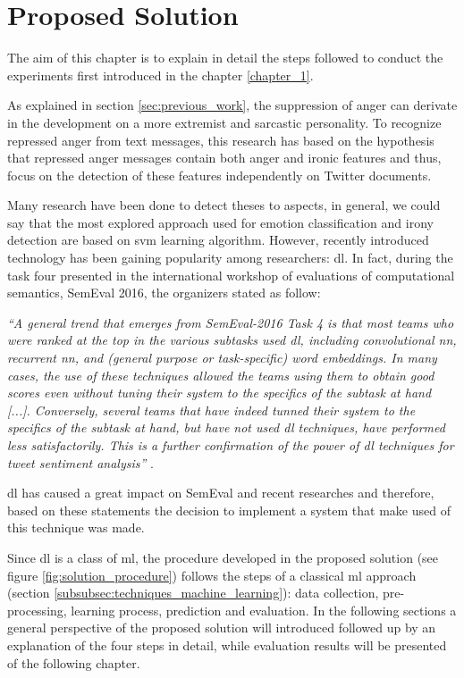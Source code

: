 \chapter{Proposed Solution}
\label{proposed_solution}

The aim of this chapter is to explain in detail the steps followed to conduct the experiments first introduced in the chapter \ref{chapter_1}.

As explained in section \ref{sec:previous_work}, the suppression of anger can derivate in the development on a more extremist and sarcastic personality. To recognize repressed anger from text messages, this research has based on the hypothesis that repressed anger messages contain both anger and ironic features and thus, focus on the detection of these features independently on Twitter documents.

Many research have been done to detect theses to aspects, in general, we could say that the most explored approach used for emotion classification and irony detection are based on \acrshort{svm} learning algorithm. However, recently introduced technology has been gaining popularity among researchers: \acrshort{dl}. In fact, during the task four presented in the international workshop of evaluations of computational semantics, SemEval 2016, the organizers stated as follow:

\textit{``A general trend that emerges from SemEval-2016 Task 4 is that most teams who were ranked at the top in the various subtasks used \acrlong{dl}, including convolutional \acrshort{nn}, recurrent \acrshort{nn}, and (general purpose or task-specific) word embeddings. In many cases, the use of these techniques allowed the teams using them to obtain good scores even without tuning their system to the specifics of the subtask at hand [...]. Conversely, several teams that have indeed tunned their system to the specifics of the subtask at hand, but have not used \acrlong{dl} techniques, have performed less satisfactorily. This is a further confirmation of the power of \acrlong{dl} techniques for tweet sentiment analysis''} \cite{nakov2016semeval}.

\acrshort{dl} has caused a great impact on SemEval and recent researches and therefore, based on these statements the decision to implement a system that make used of this technique was made.

Since \acrshort{dl} is a class of \acrshort{ml}, the procedure developed in the proposed solution (see figure \ref{fig:solution_procedure}) follows the steps of a classical \acrlong{ml} approach (section \ref{subsubsec:techniques_machine_learning}): data collection, pre-processing, learning process, prediction and evaluation. In the following sections a general perspective of the proposed solution will introduced followed up by an explanation of the four steps in detail, while evaluation results will be presented of the following chapter.

